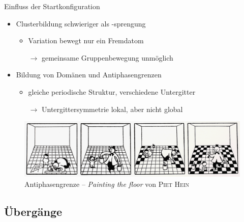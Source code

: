 \documentclass{beamer}
\begin{document}
	\begin{frame}{Einfluss der Startkonfiguration}
		\begin{itemize}
			\item Clusterbildung schwieriger als -sprengung
			\begin{itemize}
				\item Variation bewegt nur ein Fremdatom
				\item[$\rightarrow$] gemeinsame Gruppenbewegung unmöglich
			\end{itemize}
			\item Bildung von Domänen und Antiphasengrenzen
			\begin{itemize}
				\item gleiche periodische Struktur, verschiedene Untergitter
				\item[$\rightarrow$] Untergittersymmetrie lokal, aber nicht global 
			\end{itemize}
		\end{itemize}
		\begin{figure}[b]
			\includegraphics[width=\textwidth]{Abbildungen/hein.png}
			\caption{Antiphasengrenze -- \emph{Painting the floor} von \textsc{Piet Hein}}
		\end{figure}
	\end{frame}

	\subsection{Übergänge}
\end{document}
